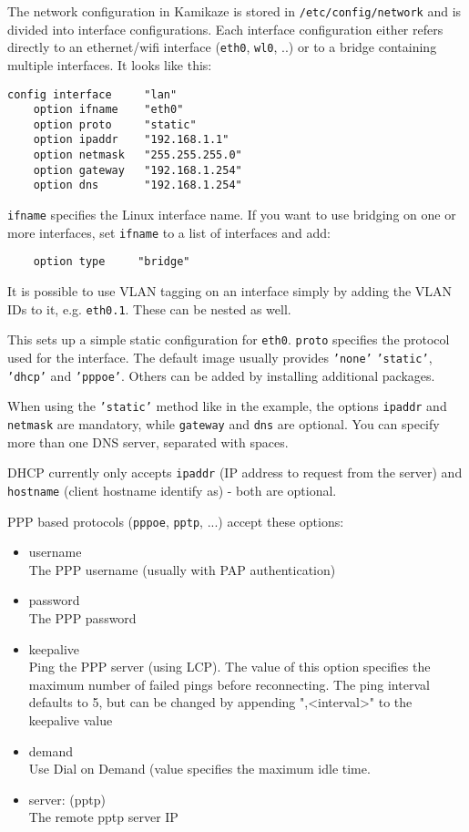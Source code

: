 The network configuration in Kamikaze is stored in \texttt{/etc/config/network}
and is divided into interface configurations.
Each interface configuration either refers directly to an ethernet/wifi
interface (\texttt{eth0}, \texttt{wl0}, ..) or to a bridge containing multiple interfaces.
It looks like this:

\begin{Verbatim}
config interface     "lan"
    option ifname    "eth0"
    option proto     "static"
    option ipaddr    "192.168.1.1"
    option netmask   "255.255.255.0"
    option gateway   "192.168.1.254"
    option dns       "192.168.1.254"
\end{Verbatim}

\texttt{ifname} specifies the Linux interface name.
If you want to use bridging on one or more interfaces, set \texttt{ifname} to a list
of interfaces and add:
\begin{Verbatim}
    option type     "bridge"
\end{Verbatim}

It is possible to use VLAN tagging on an interface simply by adding the VLAN IDs
to it, e.g. \texttt{eth0.1}. These can be nested as well.

This sets up a simple static configuration for \texttt{eth0}. \texttt{proto} specifies the
protocol used for the interface. The default image usually provides \texttt{'none'}
\texttt{'static'}, \texttt{'dhcp'} and \texttt{'pppoe'}. Others can be added by installing additional
packages.

When using the \texttt{'static'} method like in the example, the  options \texttt{ipaddr} and
\texttt{netmask} are mandatory, while \texttt{gateway} and \texttt{dns} are optional.
You can specify more than one DNS server, separated with spaces.

DHCP currently only accepts \texttt{ipaddr} (IP address to request from the server)
and \texttt{hostname} (client hostname identify as) - both are optional.

PPP based protocols (\texttt{pppoe}, \texttt{pptp}, ...) accept these options:
\begin{itemize}
    \item{username} \\
        The PPP username (usually with PAP authentication)
    \item{password} \\
        The PPP password
    \item{keepalive} \\
        Ping the PPP server (using LCP). The value of this option
        specifies the maximum number of failed pings before reconnecting.
        The ping interval defaults to 5, but can be changed by appending
        ",<interval>" to the keepalive value
    \item{demand} \\
        Use Dial on Demand (value specifies the maximum idle time.

    \item{server: (pptp)} \\
        The remote pptp server IP
\end{itemize}

